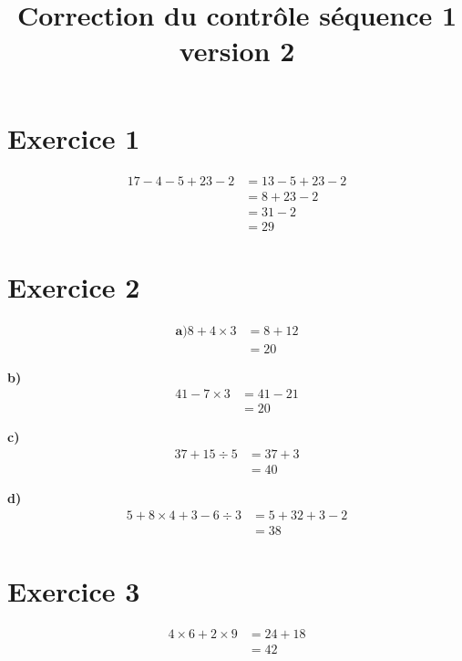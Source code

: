 \documentclass[12pt]{extarticle}
\title{\textbf{Correction du contrôle séquence 1 version 2}}
\author{}
\date{}
\begin{document}
\maketitle

\section*{Exercice 1}
\begin{align*}
17 - 4 - 5 + 23 - 2 &= 13 - 5 + 23 - 2 \\
                     &= 8 + 23 - 2 \\
                     &= 31 - 2 \\
                     &= 29
\end{align*}

\section*{Exercice 2}

\begin{align*}
\textbf{a)}
8 + 4 \times 3 &= 8 + 12 \\
               &= 20
\end{align*}

\textbf{b)}
\begin{align*}
41 - 7 \times 3 &= 41 - 21 \\
                &= 20
\end{align*}

\textbf{c)}
\begin{align*}
37 + 15 \div 5 &= 37 + 3 \\
               &= 40
\end{align*}

\textbf{d)}
\begin{align*}
5 + 8 \times 4 + 3 - 6 \div 3 &= 5 + 32 + 3 - 2 \\
                              &= 38
\end{align*}

\section*{Exercice 3}
\begin{align*}
4 \times 6 + 2 \times 9 &= 24 + 18 \\
                        &= 42
\end{align*}
\end{document}
